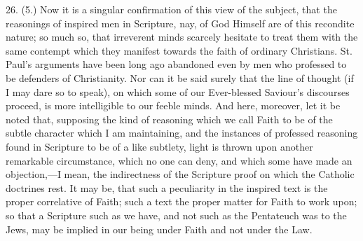 26. (5.) Now it is a singular confirmation of this view of the
subject, that the reasonings of inspired men in Scripture, nay, of God
Himself are of this recondite nature; so much so, that irreverent
minds scarcely hesitate to treat them with the same contempt which
they manifest towards the faith of ordinary Christians. St. Paul's
arguments have been long ago abandoned even by men who professed to be
defenders of Christianity. Nor can it be said surely that the line of
thought (if I may dare so to speak), on which some of our Ever-blessed
Saviour's discourses proceed, is more intelligible to our feeble
minds. And here, moreover, let it be noted that, supposing the kind of
reasoning which we call Faith to be of the subtle character which I am
maintaining, and the instances of professed reasoning found in
Scripture to be of a like subtlety, light is thrown upon another
remarkable circumstance, which no one can deny, and which some have
made an objection,—I mean, the indirectness of the Scripture proof
on which the Catholic doctrines rest. It may be, that such a
peculiarity in the inspired text is the proper correlative of Faith;
such a text the proper matter for Faith to work upon; so that a
Scripture such as we have, and not such as the Pentateuch was to the
Jews, may be implied in our being under Faith and not under the Law.

